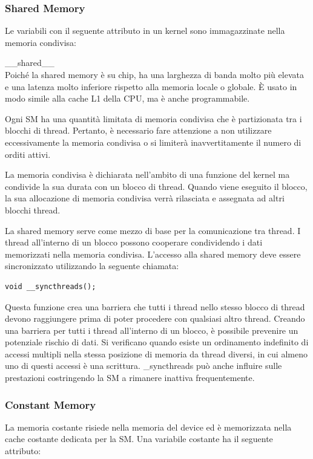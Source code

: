 \subsubsection{Shared Memory}
Le variabili con il seguente attributo in un kernel sono immagazzinate nella memoria condivisa:

\_\_shared\_\_ \\

Poiché la shared memory è su chip, ha una larghezza di banda molto più elevata e una latenza molto inferiore rispetto alla memoria locale o globale. È usato in modo simile alla cache L1 della CPU, ma è anche programmabile.

Ogni SM ha una quantità limitata di memoria condivisa che è partizionata tra i blocchi di thread. Pertanto, è necessario fare attenzione a non utilizzare eccessivamente la memoria condivisa o si limiterà inavvertitamente il numero di orditi attivi.

La memoria condivisa è dichiarata nell'ambito di una funzione del kernel ma condivide la sua durata con un blocco di thread. Quando viene eseguito il blocco, la sua allocazione di memoria condivisa verrà rilasciata e assegnata ad altri blocchi thread.

La shared memory serve come mezzo di base per la comunicazione tra thread. I thread all'interno di un blocco possono cooperare condividendo i dati memorizzati nella memoria condivisa. L'accesso alla shared memory deve essere sincronizzato utilizzando la seguente chiamata:
\begin{lstlisting}[label=code:syncthreads_def]
void __syncthreads();
\end{lstlisting}
Questa funzione crea una barriera che tutti i thread nello stesso blocco di thread devono raggiungere prima di poter procedere con qualsiasi altro thread. Creando una barriera per tutti i thread all'interno di un blocco, è possibile prevenire un potenziale rischio di dati. Si verificano quando esiste un ordinamento indefinito di accessi multipli nella stessa posizione di memoria da thread diversi, in cui almeno uno di questi accessi è una scrittura. \_syncthreads può anche influire sulle prestazioni costringendo la SM a rimanere inattiva frequentemente.

\subsubsection{Constant Memory}
La memoria costante risiede nella memoria del device ed è memorizzata nella cache costante dedicata per la SM. Una variabile costante ha il seguente attributo:

